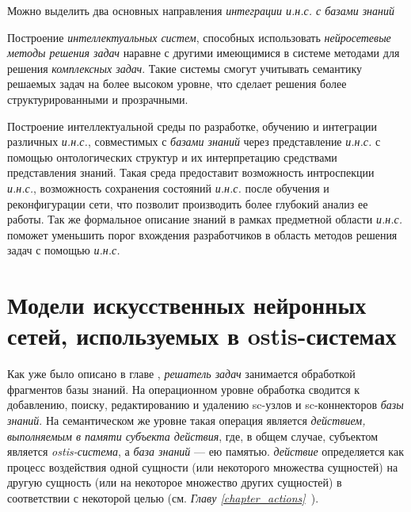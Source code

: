Можно выделить два основных направления \textit{интеграции и.н.с. с базами знаний} \:
\begin{textitemize}
	\item Построение \textit{интеллектуальных систем}, способных использовать \textit{нейросетевые методы решения задач} наравне с другими имеющимися в системе методами для решения \textit{комплексных задач}. Такие системы смогут учитывать семантику решаемых задач на более высоком уровне, что сделает решения более структурированными и прозрачными.
	\item Построение интеллектуальной среды по разработке, обучению и интеграции различных \textit{и.н.с.}, совместимых с \textit{базами знаний} через представление \textit{и.н.с.} с помощью онтологических структур и их интерпретацию средствами представления знаний. Такая среда предоставит возможность интроспекции \textit{и.н.с.}, возможность сохранения состояний \textit{и.н.с.} после обучения и реконфигурации сети, что позволит производить более глубокий анализ ее работы. Так же формальное описание знаний в рамках предметной области \textit{и.н.с.} поможет уменьшить порог вхождения разработчиков в область методов решения задач с помощью \textit{и.н.с.}
\end{textitemize}


\section{Модели искусственных нейронных сетей, используемых в ostis-системах}
\label{sec_chapter_ann_models}

Как уже было описано в главе , \textit{решатель задач} занимается обработкой фрагментов базы знаний. На операционном уровне обработка сводится к добавлению, поиску, редактированию и удалению sc-узлов и sc-коннекторов \textit{базы знаний}. На семантическом же уровне такая операция является \textit{действием, выполняемым в памяти субъекта действия}, где, в общем случае, субъектом является \textit{ostis-система}, а \textit{база знаний} --- ею памятью. \textit{действие} определяется как процесс воздействия одной сущности (или некоторого множества сущностей) на другую сущность (или на некоторое множество других сущностей) в соответствии с некоторой целью (см. \textit{Главу \ref{chapter_actions}~}).

